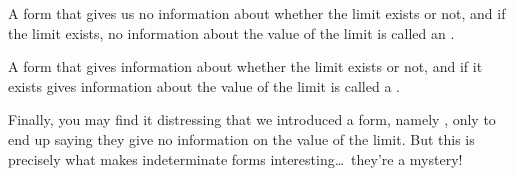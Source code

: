 \documentclass{ximera}
\begin{document}
\begin{definition}
A form that gives us no information about whether the limit exists or not, and if the limit exists, no information about the value of the limit is
called an .

A form that gives information about whether the limit exists or not, and if it exists gives information about the value of the limit is called a
.
\end{definition}  

Finally, you may find it distressing that we introduced a form, namely
\zeroOverZero, only to end up saying they give no information on the
value of the limit. But this is precisely what makes
indeterminate forms interesting\dots~they're a mystery!
\end{document}

